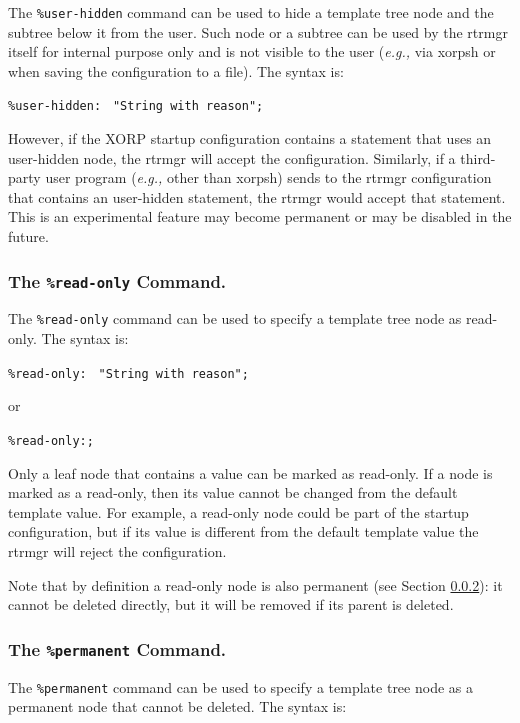 \documentclass[11pt]{article}
\newcommand{\eg}{\emph{e.g.,}\xspace}
\begin{document}
The {\tt \%user-hidden} command can be used to hide a template tree
node and the subtree below it from the user. Such node or a subtree
can be used by the rtrmgr itself for internal purpose only and is
not visible to the user (\eg via xorpsh or when saving the configuration
to a file).
The syntax is:

\texttt{\%user-hidden: } \texttt{"String with reason"}\texttt{;}

However, if the XORP startup configuration contains a statement that
uses an user-hidden node, the rtrmgr will accept
the configuration. Similarly, if a third-party user program
(\eg other than xorpsh) sends to the rtrmgr configuration that contains
an user-hidden statement, the rtrmgr would accept that statement. This
is an experimental feature may become permanent or may be disabled in
the future.

\subsubsection{The {\tt \%read-only} Command.}

The {\tt \%read-only} command can be used to specify a template tree
node as read-only.
The syntax is:

\texttt{\%read-only: } \texttt{"String with reason"}\texttt{;}

or

\texttt{\%read-only:;}

Only a leaf node that contains a value can be marked as read-only.
If a node is marked as a read-only, then its value cannot be
changed from the default template value. For example, a read-only
node could be part of the startup configuration, but if its
value is different from the default template value the rtrmgr
will reject the configuration.

Note that by definition a read-only node is also permanent
(see Section \ref{sec:permanent-command}):
it cannot be deleted directly, but it will be removed if its
parent is deleted.

\subsubsection{The {\tt \%permanent} Command.}
\label{sec:permanent-command}

The {\tt \%permanent} command can be used to specify a template tree
node as a permanent node that cannot be deleted.
The syntax is:
\end{document}
